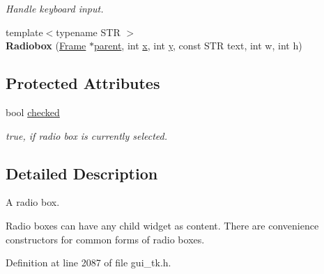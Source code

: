 \begin{DoxyCompactItemize}
\begin{DoxyCompactList}\small\item\em Handle keyboard input. \end{DoxyCompactList}\item 
\hypertarget{classGUI_1_1Radiobox_a1043df1e70f217de9e5e61563f5d8ef1}{{\footnotesize template$<$typename S\-T\-R $>$ }\\{\bfseries Radiobox} (\hyperlink{classGUI_1_1Frame}{Frame} $\ast$\hyperlink{classGUI_1_1Window_a2e593ff65e7702178d82fe9010a0b539}{parent}, int \hyperlink{classGUI_1_1Window_a6ca6a80ca00c9e1d8ceea8d3d99a657d}{x}, int \hyperlink{classGUI_1_1Window_a0ee8e923aff2c3661fc2e17656d37adf}{y}, const S\-T\-R text, int w, int h)}\label{classGUI_1_1Radiobox_a1043df1e70f217de9e5e61563f5d8ef1}

\end{DoxyCompactItemize}
\subsection*{Protected Attributes}
\begin{DoxyCompactItemize}
\item 
\hypertarget{classGUI_1_1Radiobox_ace7ecfe96f9746040c020362d13d7046}{bool \hyperlink{classGUI_1_1Radiobox_ace7ecfe96f9746040c020362d13d7046}{checked}}\label{classGUI_1_1Radiobox_ace7ecfe96f9746040c020362d13d7046}

\begin{DoxyCompactList}\small\item\em {\ttfamily true}, if radio box is currently selected. \end{DoxyCompactList}\end{DoxyCompactItemize}


\subsection{Detailed Description}
A radio box. 

Radio boxes can have any child widget as content. There are convenience constructors for common forms of radio boxes. 

Definition at line 2087 of file gui\-\_\-tk.\-h.




